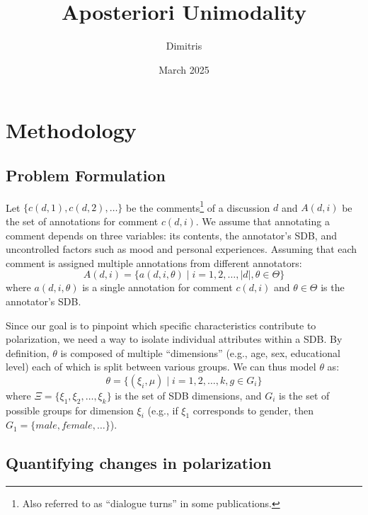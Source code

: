 \documentclass{article}
\title{Aposteriori Unimodality}
\author{Dimitris }
\date{March 2025}
\begin{document}
\maketitle

\section{Methodology}

\subsection{Problem Formulation}
\label{ssec:methodology:problem}

Let $\{c(d,1), c(d,2), \ldots\}$ be the comments\footnote{Also referred to as “dialogue turns” in some publications.} of a discussion $d$ and $A(d, i)$ be the set of annotations for comment $c(d, i)$. We assume that annotating a comment depends on three variables: its contents, the annotator's \ac{SDB}, and uncontrolled factors such as mood and personal experiences. Assuming that each comment is assigned multiple annotations from different annotators:
\begin{equation}
    A(d, i) = \{a(d, i, \theta) \mid i=1, 2, \ldots, \lvert d \rvert, \theta \in \Theta \}
\end{equation}
\noindent where  $a(d, i, \theta)$ is a single annotation for comment $c(d,i)$ and $\theta \in \Theta$ is the annotator's \ac{SDB}.

Since our goal is to pinpoint which specific characteristics contribute to polarization, we need a way to isolate individual attributes within a \ac{SDB}. By definition, $\theta$ is composed of multiple ``dimensions'' (e.g., age, sex, educational level) each of which is split between various groups. We can thus model $\theta$ as:
\begin{equation}
    \theta = \{(\xi_i, \mu) \mid i=1, 2, \ldots, k \mathpunct{,} g \in G_i\}
\end{equation} 
\noindent where $\Xi=\{\xi_1, \xi_2, \ldots, \xi_k\}$ is the set of \ac{SDB} dimensions, and $G_i$ is the set of possible groups for dimension $\xi_i$ (e.g., if $\xi_1$ corresponds to gender, then $G_1=\{\textit{male}, \textit{female}, \ldots\}$).


\subsection{Quantifying changes in polarization}
\label{ssec:methodology:polstat}
\end{document}
